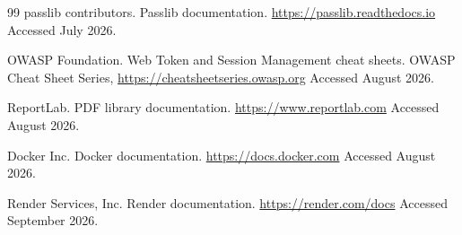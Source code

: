 \begin{thebibliography}{99}
passlib contributors.
\newblock Passlib documentation.
\newblock \url{https://passlib.readthedocs.io}
\newblock Accessed July 2026.

OWASP Foundation.
 Web Token and Session Management cheat sheets.
\newblock OWASP Cheat Sheet Series, \url{https://cheatsheetseries.owasp.org}
\newblock Accessed August 2026.

ReportLab.
 {PDF} library documentation.
\newblock \url{https://www.reportlab.com}
\newblock Accessed August 2026.

Docker Inc.
\newblock Docker documentation.
\newblock \url{https://docs.docker.com}
\newblock Accessed August 2026.

Render Services, Inc.
\newblock Render documentation.
\newblock \url{https://render.com/docs}
\newblock Accessed September 2026.

\end{thebibliography}

